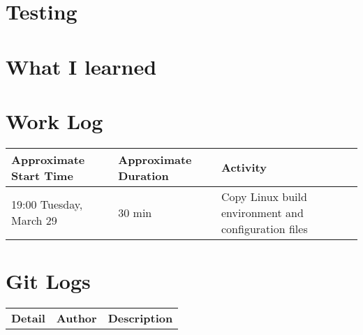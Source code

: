 \documentclass[10pt,conference,draftclsnofoot,onecolumn]{IEEEtran}
\begin{document}
\section{Testing}


\section{What I learned}



\section{Work Log}
\begin{tabular}{|p{5cm}|p{5cm}|p{5cm}}
    \textbf{Approximate Start Time} & \textbf{Approximate Duration} & \textbf{Activity} \\
    \hline
    19:00 Tuesday, March 29 & 30 min & Copy Linux build environment and configuration files \\

\end{tabular}

\bigskip
\bigskip

\section{Git Logs}
\begin{tabular}{l l l}\textbf{Detail} & \textbf{Author} & \textbf{Description}\\ 
\end{tabular}


\clearpage
\printbibliography
\end{document}
